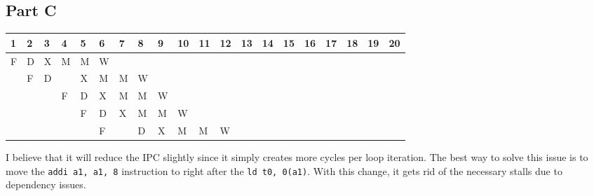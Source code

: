 \documentclass[letter]{article}
\theoremstyle{case}
\begin{document}
\subsection*{Part C}

\begin{table}[!h]
\centering
\begin{tabular}{l|l|l|l|l|l|l|l|l|l|l|l|l|l|l|l|l|l|l|l}
1                       & 2 & 3 & 4 & 5 & 6 & 7 & 8 & 9 & 10 & 11 & 12 & 13 & 14 & 15 & 16 & 17 & 18 & 19 & 20                    \\ \hline
\multicolumn{1}{|l|}{F} & D & X & M & M & W &   &   &   &    &    &    &    &    &    &    &    &    &    & \multicolumn{1}{l|}{} \\ \hline
\multicolumn{1}{|l|}{}  & F & D &   & X & M & M & W &   &    &    &    &    &    &    &    &    &    &    & \multicolumn{1}{l|}{} \\ \hline
\multicolumn{1}{|l|}{}  &   &   & F & D & X & M & M & W &    &    &    &    &    &    &    &    &    &    & \multicolumn{1}{l|}{} \\ \hline
\multicolumn{1}{|l|}{}  &   &   &   & F & D & X & M & M & W  &    &    &    &    &    &    &    &    &    & \multicolumn{1}{l|}{} \\ \hline
\multicolumn{1}{|l|}{}  &   &   &   &   & F &   & D & X & M  & M  & W  &    &    &    &    &    &    &    & \multicolumn{1}{l|}{} \\ \hline
\end{tabular}
\end{table}
I believe that it will reduce the IPC slightly since it simply creates more cycles per loop iteration. The best way to solve this issue is to move the \texttt{addi a1, a1, 8} instruction to right after the \texttt{ld t0, 0(a1)}. With this change, it gets rid of the necessary stalls due to dependency issues.
\end{document}
